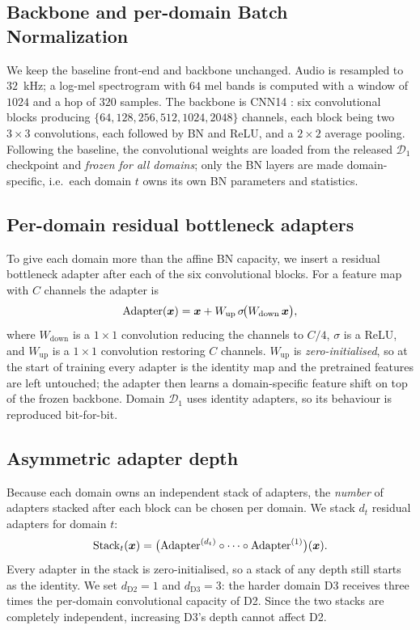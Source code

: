 \documentclass{article}
\newcommand{\symvec}[1]{{\mbox{\boldmath $#1$}}}
\begin{document}
\begin{sloppy}
\subsection{Backbone and per-domain Batch Normalization}
\label{ssec:backbone}

We keep the baseline front-end and backbone unchanged. Audio is resampled to
$32$~kHz; a log-mel spectrogram with $64$ mel bands
is computed with a window of $1024$ and a hop of $320$ samples. The backbone
is CNN14 \cite{kong2020panns}: six convolutional blocks producing
$\{64,128,256,512,1024,2048\}$ channels, each block being two
$3\times3$ convolutions, each followed by BN and ReLU, and a $2\times2$
average pooling. Following the baseline, the convolutional weights are loaded
from the released $\mathcal{D}_1$ checkpoint and \emph{frozen for all
domains}; only the BN layers are made domain-specific, i.e.\ each domain $t$
owns its own BN parameters and statistics.

\subsection{Per-domain residual bottleneck adapters}
\label{ssec:adapters}

To give each domain more than the affine BN capacity, we insert a residual
bottleneck adapter after each of the six convolutional blocks. For a feature
map with $C$ channels the adapter is
\begin{equation}
  \label{eqn:adapter}
  \mathrm{Adapter}(\symvec{x}) =
    \symvec{x} + W_{\text{up}}\,\sigma\!\big(W_{\text{down}}\,\symvec{x}\big),
\end{equation}
where $W_{\text{down}}$ is a $1\times1$ convolution reducing the channels to
$C/4$, $\sigma$ is a ReLU, and $W_{\text{up}}$ is a $1\times1$ convolution
restoring $C$ channels. $W_{\text{up}}$ is \emph{zero-initialised}, so at the
start of training every adapter is the identity map and the pretrained
features are left untouched; the adapter then learns a domain-specific
feature shift on top of the frozen backbone. Domain $\mathcal{D}_1$ uses
identity adapters, so its behaviour is reproduced bit-for-bit.

\subsection{Asymmetric adapter depth}
\label{ssec:asym}

Because each domain owns an independent stack of adapters, the \emph{number}
of adapters stacked after each block can be chosen per domain. We stack
$d_t$ residual adapters for domain $t$:
\begin{equation}
  \label{eqn:stack}
  \mathrm{Stack}_t(\symvec{x}) =
    \big(\mathrm{Adapter}^{(d_t)} \circ \cdots \circ
         \mathrm{Adapter}^{(1)}\big)(\symvec{x}).
\end{equation}
Every adapter in the stack is zero-initialised, so a stack of any depth still
starts as the identity. We set $d_{\mathrm{D2}}=1$ and $d_{\mathrm{D3}}=3$:
the harder domain D3 receives three times the per-domain convolutional
capacity of D2. Since the two stacks are completely independent, increasing
D3's depth cannot affect D2.


\end{sloppy}
\end{document}
